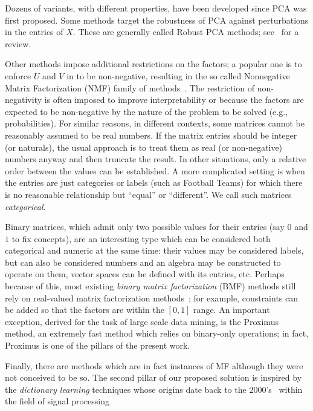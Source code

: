 \documentclass[a4paper]{IEEEtran}
\begin{document}
Dozens of variants, with different properties, have been developed since PCA was first proposed. Some methods target the robustness of PCA against perturbations in the entries of $X$. These are generally called Robust PCA methods; see~\cite{rpca-review} for a review. 

Other methods impose additional restrictions on the factors; a popular one is to enforce $U$ and $V$ in  to be non-negative, resulting in the so called Nonnegative Matrix Factorization (NMF) family of methods~\cite{nmf-review}. The restriction of non-negativity is often imposed to improve interpretability  or because the factors are expected to be non-negative by the nature of the problem to be solved (e.g., probabilities). For similar reasons, in different contexts, some matrices cannot be reasonably assumed to be real numbers. If the matrix entries should be integer (or naturals), the usual approach is to treat them as real (or non-negative) numbers anyway and then truncate the result. In other situations, only a relative order between the values can be established. A  more complicated setting is when the entries are just categories or labels (such as Football Teams) for which there is no reasonable relationship  but ``equal'' or ``different''. We call such matrices \emph{categorical}. 

Binary matrices, which admit only two possible values for their entries (say $0$ and $1$ to fix concepts), are an interesting type which can be considered both categorical and numeric at the same time: their values may be considered labels, but can also be considered numbers and an algebra may be constructed to operate on them, vector spaces can be defined with its entries, etc. Perhaps because of this, most existing \emph{binary matrix factorization} (BMF) methods still rely on real-valued matrix factorization methods~\cite{bmf-prev}; for example, constraints can be added so that the factors are within the $[0,1]$ range. An important exception, derived for the task of large scale data mining, is the Proximus~\cite{proximus} method, an extremely fast method which relies on binary-only operations; in fact, Proximus is one of the pillars of the present work.

Finally, there are methods which are in fact instances of MF although they were not conceived to be so. The second pillar of our proposed solution is inspired by the \emph{dictionary learning} techniques whose origins date back to the 2000's~\cite{olshausen97,engan00,elad06} within the field of signal processing
\end{document}
